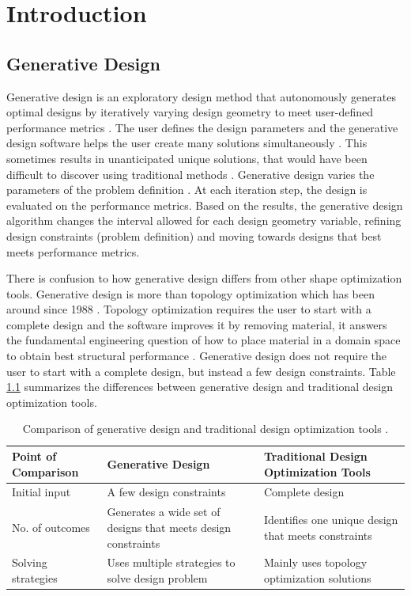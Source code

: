 \chapter{Introduction}
\section{Generative Design}
Generative design is an exploratory design method that autonomously 
generates optimal designs by iteratively varying design geometry 
to meet user-defined performance metrics 
\cite{krish_practical_2011,oh_deep_2019}.
The user defines the design parameters and the generative 
design software helps the user create many solutions 
simultaneously \cite{autodesk_autodesk_2020}. 
This sometimes results in unanticipated unique solutions, that 
would have been difficult to discover using traditional methods
\cite{autodesk_autodesk_2020}.
Generative design varies the parameters of the problem definition
\cite{matejka_dream_2018}. 
At each iteration step, the design is evaluated on the 
performance metrics. 
Based on the results, the generative design algorithm changes the 
interval allowed for each design geometry variable, refining 
design constraints (problem definition) and moving towards 
designs that best meets performance metrics.

There is confusion to how generative design differs from other shape 
optimization tools. 
Generative design is more than topology optimization which has been 
around since 1988 \cite{bendsoe_generating_1988}. 
Topology optimization requires the user to start with a complete design 
and the software improves it by removing material, it answers the 
fundamental engineering question of how to place material in a domain space 
to obtain best structural performance \cite{sigmund_topology_2013}.   
Generative design does not require the user to start with a complete design, but 
instead a few design constraints. 
Table \ref{tab:compare} summarizes the differences between generative design and 
traditional design optimization tools. 

\begin{table}[!htbp]
        \caption{Comparison of generative design and traditional design optimization tools
        \cite{autodesk_fusion_2020}.}
        \label{tab:compare}
        \centering
        \doublespacing
        \small
        \begin{tabular}{p{3.7cm}|p{5.5cm}p{6cm}}
        \hline
        \textbf{Point of Comparison} & \textbf{Generative Design} & \textbf{Traditional Design Optimization Tools}  \\ \hline
        Initial input & A few design constraints & Complete design \\ 
        No. of outcomes & Generates a wide set of designs that meets design constraints & Identifies one unique design that meets constraints \\   
        Solving strategies & Uses multiple strategies to solve design problem & Mainly uses topology optimization solutions \\ \hline
        \end{tabular}
\end{table}

